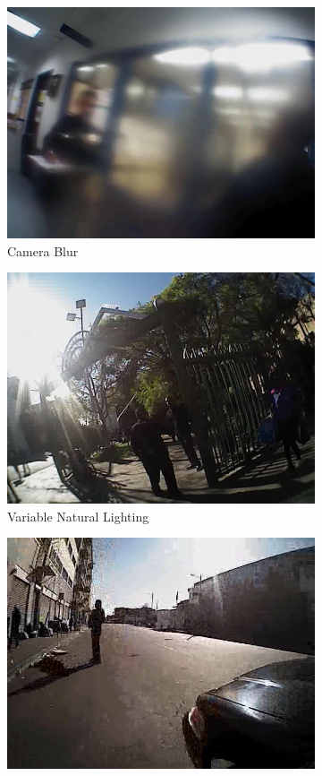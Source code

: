 \documentclass[a4paper]{article}
\begin{document}
\begin{figure}[H]
\begin{subfigure}{.33\textwidth}
	\centering	
    \includegraphics[width=.8\linewidth]{blur_censored.jpg}
    \caption{Camera Blur}
    \label{fig:sfig1}
\end{subfigure}%
\begin{subfigure}{.33\textwidth}
	\centering
    \includegraphics[width=.8\linewidth]{bright_censored.jpg}
	\caption{Variable Natural Lighting}
    \label{fig:sfig2}
\end{subfigure}
\begin{subfigure}{.33\textwidth}
	\centering
    \includegraphics[width=.8\linewidth]{lowres_censored.jpg}

\end{subfigure}
\end{figure}
\end{document}
